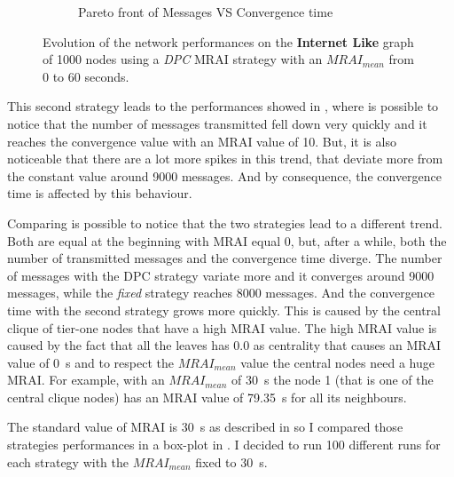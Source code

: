 \begin{figure}[h]
\begin{subfigure}[b]{0.45\textwidth}
		 \caption{Pareto front of Messages VS Convergence time}
         \label{fig:internt_like_1000_DPC_evolution_paretoFront}
     \end{subfigure}
		\caption{Evolution of the network performances on the \textbf{Internet Like} graph
			of \num{1000} nodes using a \textit{DPC} \ac{MRAI} strategy
			with an $MRAI_{mean}$ from \num{0} to \num{60} seconds.}
        \label{fig:internet_like_1000_dpc_evolution}
\end{figure}

This second strategy leads to the performances showed in ,
where is possible to notice that the number of messages transmitted fell down
very quickly and it reaches the convergence value with an \ac{MRAI} value of
\num{10}.
But, it is also noticeable that there are a lot more spikes in this trend, that
deviate more from the constant value around \num{9000} messages.
And by consequence, the convergence time is affected by this behaviour.

Comparing 
is possible to notice that the two strategies lead to a different trend.
Both are equal at the beginning with \ac{MRAI} equal \num{0}, but, after a while,
both the number of transmitted messages and the convergence time diverge.
The number of messages with the \ac{DPC} strategy variate more and it converges
around \num{9000} messages, while the \textit{fixed} strategy reaches \num{8000}
messages.
And the convergence time with the second strategy grows more quickly.
This is caused by the central clique of tier-one nodes that have a high \ac{MRAI}
value.
The high \ac{MRAI} value is caused by the fact that all the leaves has \num{0.0}
as centrality that causes an \ac{MRAI} value of \SI{0}{\second} and to respect
the $MRAI_{mean}$ value the central nodes need a huge \ac{MRAI}.
For example, with an $MRAI_{mean}$ of \SI{30}{\second} the node \num{1} (that is
one of the central clique nodes) has an \ac{MRAI} value of \SI{79.35}{\second} for all its
neighbours.


The standard value of \ac{MRAI} is \SI{30}{\second} as described in
\cite{rfc4271} so I compared those strategies performances in a box-plot in
.
I decided to run \num{100} different runs for each strategy with the $MRAI_{mean}$
fixed to \SI{30}{\second}.


